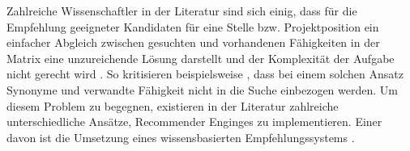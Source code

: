 Zahlreiche Wissenschaftler in der Literatur sind sich einig, dass für die Empfehlung geeigneter Kandidaten für eine Stelle bzw. Projektposition ein einfacher Abgleich zwischen gesuchten und vorhandenen Fähigkeiten in der Matrix eine unzureichende Lösung darstellt \cite[S. 1]{enhancingERecruitment:2012}\cite[S. 1]{faerber:2003}\cite[S. 2]{prospect:2010} und der Komplexität der Aufgabe nicht gerecht wird \cite[S. 1]{malinowski:2008}. So kritisieren beispielsweise \textcite[S. 1f.]{mitre:2014}, dass bei einem solchen Ansatz Synonyme und verwandte Fähigkeit nicht in die Suche einbezogen werden. Um diesem Problem zu begegnen, existieren in der Literatur zahlreiche unterschiedliche Ansätze, Recommender Enginges zu implementieren. Einer davon ist die Umsetzung eines wissensbasierten Empfehlungssystems \cite[S. 2f.]{dwivedi:2017}.

